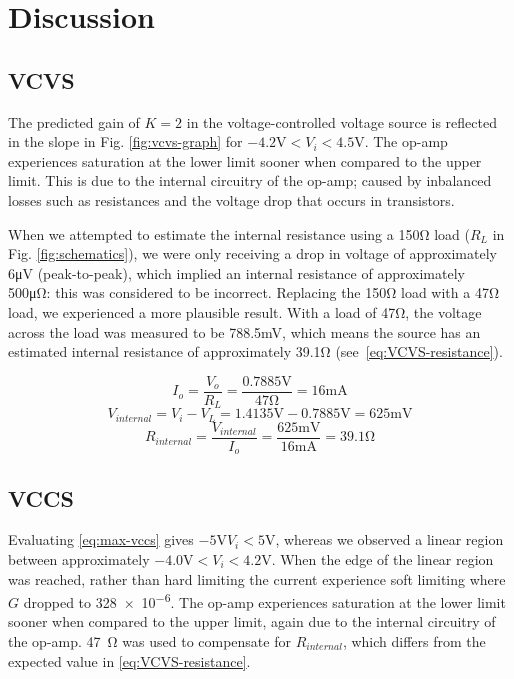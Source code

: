 \section{Discussion}\label{sec:discussion}
\subsection{VCVS}

The predicted gain of $K=2$ in the voltage-controlled voltage source is reflected in the slope in Fig. \ref{fig:vcvs-graph} for $-4.2\si{\volt}<V_i<4.5\si{\volt}$. The op-amp experiences saturation at the lower limit sooner when compared to the upper limit. This is due to the internal circuitry of the op-amp; caused by inbalanced losses such as resistances and the voltage drop that occurs in transistors.

When we attempted to estimate the internal resistance using a 150\si{\ohm} load ($R_L$ in Fig. \ref{fig:schematics}), we were only receiving a drop in voltage of approximately 6\si{\micro\volt} (peak-to-peak), which implied an internal resistance of approximately 500\si{\micro\ohm}: this was considered to be incorrect. Replacing the 150\si{\ohm} load with a 47\si{\ohm} load, we experienced a more plausible result. With a load of 47\si{\ohm}, the voltage across the load was measured to be 788.5\si{\milli\volt}, which means the source has an estimated internal resistance of approximately 39.1\si{\ohm} (see~\eqref{eq:VCVS-resistance}).

\begin{equation*}
I_o	= \frac{V_o}{R_L} = \frac{0.7885\si{\volt}}{47\si{\ohm}} = 16\si{\milli\ampere}
\end{equation*}
\begin{equation*}
V_{internal}		= V_i - V_L = 1.4135\si{\volt} - 0.7885\si{\volt} = 625\si{\milli\volt}
\end{equation*}
\begin{equation}
\label{eq:VCVS-resistance}
R_{internal}	= \frac{V_{internal}}{I_o} = \frac{625\si{\milli\volt}}{16\si{\milli\ampere}} = 39.1\si{\ohm}
\end{equation}

\subsection{VCCS}

Evaluating \eqref{eq:max-vccs} gives $-5\si{\volt} V_i < 5\si{\volt}$, whereas we observed a linear region between approximately $-4.0\si{\volt}<V_i<4.2\si{\volt}$.
When the edge of the linear region was reached, rather than hard limiting the current experience soft limiting where $G$ dropped to \num{328e-6}.
The op-amp experiences saturation at the lower limit sooner when compared to the upper limit, again due to the internal circuitry of the op-amp.
\SI{47}{\ohm} was used to compensate for $R_{internal}$, which differs from the expected value in \eqref{eq:VCVS-resistance}.


